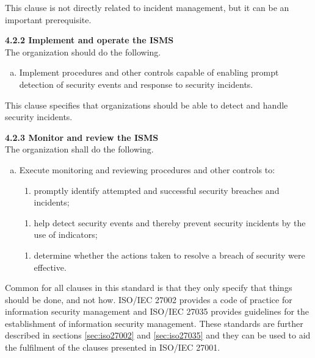 This clause is not directly related to incident management, but it can be an important prerequisite. %

\textbf{4.2.2 Implement and operate the \ac{ISMS}} \\
The organization should do the following.
\begin{enumerate}[h)]
\item Implement procedures and other controls capable of enabling prompt detection of security events and response to security incidents.
\end{enumerate}

This clause specifies that organizations should be able to detect and handle security incidents.

\textbf{4.2.3 Monitor and review the ISMS}\\
The organization shall do the following.
\begin{enumerate}[a)]
\item Execute monitoring and reviewing procedures and other controls to:
\begin{enumerate}[2)]
\item promptly identify attempted and successful security breaches and incidents;
\end{enumerate}
\vspace{-0.2cm}
\begin{enumerate}[4)]
\item help detect security events and thereby prevent security incidents by the use of indicators;
\end{enumerate}
\vspace{-0.2cm}
\begin{enumerate}[5)]
\item determine whether the actions taken to resolve a breach of security were effective.
\end{enumerate}
\end{enumerate}

Common for all clauses in this standard is that they only specify that things should be done, and not how. \acs{ISO}/\acs{IEC} 27002 provides a code of practice for information security management and \acs{ISO}/\acs{IEC} 27035 provides guidelines for the establishment of information security management. These standards are further described in sections \ref{sec:iso27002} and \ref{sec:iso27035} and they can be used to aid the fulfilment of the clauses presented in \acs{ISO}/\acs{IEC} 27001.